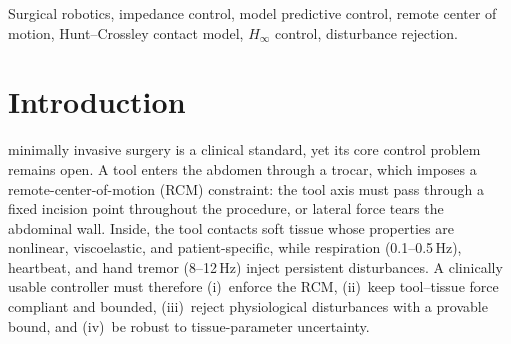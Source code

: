 \begin{abstract}
Robot-assisted laparoscopy must steer an instrument that pivots about the trocar incision---the remote center of motion (RCM)---while keeping tool--tissue forces safe under nonlinear tissue contact and respiration. We extend a two-layer Impedance MPC in which a feedforward layer cancels manipulator nonlinearities, exposing a configuration-independent double-integrator residual, and a small convex QP with an augmented Kalman disturbance state delivers offset-free tracking. First, the RCM is formulated as a hard constraint at every horizon step (and analyzed; validation isolates the joint-space rows as the sole remaining component). Second, the random-walk disturbance model is augmented with an adaptive Hunt--Crossley tissue estimator and a respiration oscillator, so structured disturbances are predicted rather than merely rejected. Third, since the post-feedforward plant is linear, the feedback is synthesized directly: the $H_2$ gain is the classical impedance the unconstrained MPC realizes, while $H_\infty$ bounds the disturbance-to-force gain by $\gamma$, making peak-force safety a closed-loop invariant. The constant-$A_d$ structure is preserved, keeping the QP solvable in under 1\,ms. A MuJoCo implementation on a 7-DoF manipulator with a compliant trocar verifies the design: steady-state tip error falls from 3.94\,mm to 0.03\,mm under sustained tissue contact, the force-safety governor caps a commanded tissue overrun near the 3\,N budget versus 5.4\,N push-through, and force safety survives sensor noise, bias, and stick-slip trocar friction.
\end{abstract}

\begin{IEEEkeywords}
Surgical robotics, impedance control, model predictive control, remote center of motion, Hunt--Crossley contact model, $H_\infty$ control, disturbance rejection.
\end{IEEEkeywords}

\section{Introduction}

 minimally invasive surgery is a clinical standard, yet its core control problem remains open. A tool enters the abdomen through a trocar, which imposes a remote-center-of-motion (RCM) constraint: the tool axis must pass through a fixed incision point throughout the procedure, or lateral force tears the abdominal wall. Inside, the tool contacts soft tissue whose properties are nonlinear, viscoelastic, and patient-specific, while respiration (0.1--0.5\,Hz), heartbeat, and hand tremor (8--12\,Hz) inject persistent disturbances. A clinically usable controller must therefore (i)~enforce the RCM, (ii)~keep tool--tissue force compliant and bounded, (iii)~reject physiological disturbances with a provable bound, and (iv)~be robust to tissue-parameter uncertainty.

